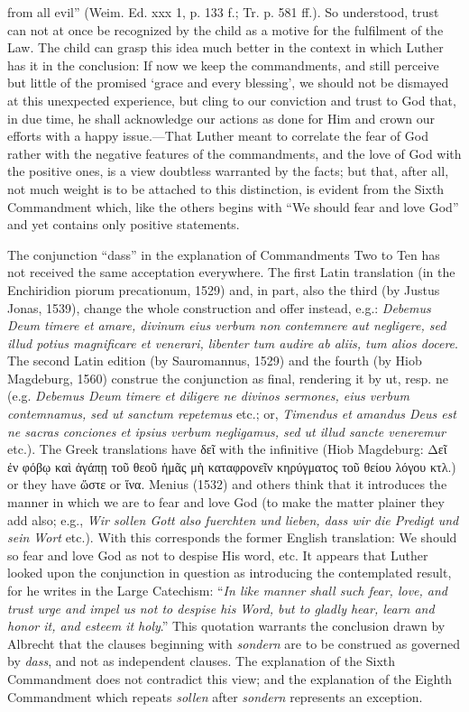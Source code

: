 from all evil” (Weim. Ed. xxx 1, p. 133 f.; Tr. p. 581 ff.). So understood, trust can not at once be recognized by the child as a motive for the fulfilment of the Law. The child can grasp this idea much better in the context in which Luther has it in the conclusion: If now we keep the commandments, and still perceive but little of the promised ‘grace and every blessing’, we should not be dismayed at this unexpected experience, but cling to our conviction and trust to God that, in due time, he shall acknowledge our actions as done for Him and crown our efforts with a happy issue.—That Luther meant to correlate the fear of God rather with the negative features of the commandments, and the love of God with the positive ones, is a view doubtless warranted by the facts; but that, after all, not much weight is to be attached to this distinction, is evident from the Sixth Commandment which, like the others begins with “We should fear and love God” and yet contains only positive statements.

The conjunction “dass” in the explanation of Commandments Two to Ten has not received the same acceptation everywhere. The first Latin translation (in the Enchiridion piorum precationum, 1529) and, in part, also the third (by Justus Jonas, 1539), change the whole construction and offer instead, e.g.: \emph{Debemus Deum timere et amare, divinum eius verbum non contemnere aut negligere, sed illud potius magnificare et venerari, libenter tum audire ab aliis, tum alios docere}. The second Latin edition (by Sauromannus, 1529) and the fourth (by Hiob Magdeburg, 1560) construe the conjunction as final, rendering it by ut, resp. ne (e.g. \emph{Debemus Deum timere et diligere ne divinos sermones, eius verbum contemnamus, sed ut sanctum repetemus} etc.; or, \emph{Timendus et amandus Deus est ne sacras conciones et ipsius verbum negligamus, sed ut illud sancte veneremur} etc.). The Greek translations have δεῖ with the infinitive (Hiob Magdeburg: Δεῖ ἐν φόβῳ καὶ ἀγάπῃ τοῦ θεοῦ ἡμᾶς μὴ καταφρονεῖν κηρύγματος τοῦ θείου λόγου κτλ.) or they have ὥστε or ἵνα. Menius (1532) and others think that it introduces the manner in which we are to fear and love God (to make the matter plainer they add also; e.g., \emph{Wir sollen Gott also fuerchten und lieben, dass wir die Predigt und sein Wort} etc.). With this corresponds the former English translation: We should so fear and love God as not to despise His word, etc. It appears that Luther looked upon the conjunction in question as introducing the contemplated result, for he writes in the Large Catechism: “\emph{In like manner shall such fear, love, and trust urge and impel us not to despise his Word, but to gladly hear, learn and honor it, and esteem it holy}.” This quotation warrants the conclusion
drawn by Albrecht that the clauses beginning with \emph{sondern} are to be construed as governed by \emph{dass}, and not as independent clauses. The explanation of the Sixth Commandment does not contradict this view; and the explanation of the Eighth Commandment which repeats \emph{sollen} after \emph{sondern} represents an exception.

